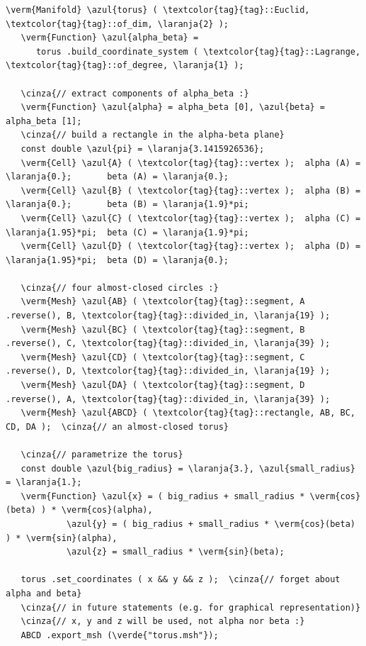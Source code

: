 \begin{Verbatim}[commandchars=\\\{\},formatcom=\small\tt,frame=single,
   label=parag-\ref{\numb section 2.\numb parag 16}.cpp,rulecolor=\color{coment},
   baselinestretch=0.94,framesep=2mm]
   \verm{Manifold} \azul{torus} ( \textcolor{tag}{tag}::Euclid, \textcolor{tag}{tag}::of_dim, \laranja{2} );
   \verm{Function} \azul{alpha_beta} =
      torus .build_coordinate_system ( \textcolor{tag}{tag}::Lagrange, \textcolor{tag}{tag}::of_degree, \laranja{1} );

   \cinza{// extract components of alpha_beta :}
   \verm{Function} \azul{alpha} = alpha_beta [0], \azul{beta} = alpha_beta [1];
   \cinza{// build a rectangle in the alpha-beta plane}
   const double \azul{pi} = \laranja{3.1415926536};
   \verm{Cell} \azul{A} ( \textcolor{tag}{tag}::vertex );  alpha (A) = \laranja{0.};       beta (A) = \laranja{0.};
   \verm{Cell} \azul{B} ( \textcolor{tag}{tag}::vertex );  alpha (B) = \laranja{0.};       beta (B) = \laranja{1.9}*pi;
   \verm{Cell} \azul{C} ( \textcolor{tag}{tag}::vertex );  alpha (C) = \laranja{1.95}*pi;  beta (C) = \laranja{1.9}*pi;
   \verm{Cell} \azul{D} ( \textcolor{tag}{tag}::vertex );  alpha (D) = \laranja{1.95}*pi;  beta (D) = \laranja{0.};

   \cinza{// four almost-closed circles :}
   \verm{Mesh} \azul{AB} ( \textcolor{tag}{tag}::segment, A .reverse(), B, \textcolor{tag}{tag}::divided_in, \laranja{19} );
   \verm{Mesh} \azul{BC} ( \textcolor{tag}{tag}::segment, B .reverse(), C, \textcolor{tag}{tag}::divided_in, \laranja{39} );
   \verm{Mesh} \azul{CD} ( \textcolor{tag}{tag}::segment, C .reverse(), D, \textcolor{tag}{tag}::divided_in, \laranja{19} );
   \verm{Mesh} \azul{DA} ( \textcolor{tag}{tag}::segment, D .reverse(), A, \textcolor{tag}{tag}::divided_in, \laranja{39} );
   \verm{Mesh} \azul{ABCD} ( \textcolor{tag}{tag}::rectangle, AB, BC, CD, DA );  \cinza{// an almost-closed torus}
   
   \cinza{// parametrize the torus}
   const double \azul{big_radius} = \laranja{3.}, \azul{small_radius} = \laranja{1.};
   \verm{Function} \azul{x} = ( big_radius + small_radius * \verm{cos}(beta) ) * \verm{cos}(alpha),
            \azul{y} = ( big_radius + small_radius * \verm{cos}(beta) ) * \verm{sin}(alpha),
            \azul{z} = small_radius * \verm{sin}(beta);

   torus .set_coordinates ( x && y && z );  \cinza{// forget about alpha and beta}
   \cinza{// in future statements (e.g. for graphical representation)}
   \cinza{// x, y and z will be used, not alpha nor beta :}
   ABCD .export_msh (\verde{"torus.msh"});
\end{Verbatim}

